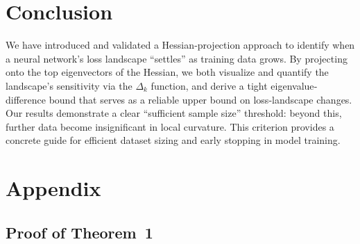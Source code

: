 \documentclass{article}
\begin{document}
\section{Conclusion}\label{sec:concl}

We have introduced and validated a Hessian‐projection approach to identify when a neural network’s loss landscape “settles” as
training data grows. By projecting onto the top eigenvectors of the Hessian, we both visualize and quantify the landscape’s
sensitivity via the $\Delta_k$ function, and derive a tight eigenvalue‐difference bound that serves as a reliable upper bound on
loss‐landscape changes. Our results demonstrate a clear “sufficient sample size” threshold: beyond this, further data become
insignificant in local curvature. This criterion provides a concrete guide for efficient dataset sizing and early stopping in
model training.







\newpage
\appendix
\section{Appendix}\label{app}

\subsection{Proof of Theorem~1}\label{app:th_1}
\end{document}
